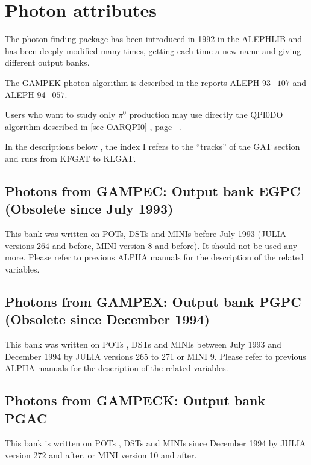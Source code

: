 \section{\label{sec-GAMPHO} Photon attributes}
\par
    The photon-finding package has been introduced in 1992 in the ALEPHLIB and has been deeply
  modified many times, getting each time a new name and giving
  different output banks.
 
\par
   The GAMPEK photon algorithm is described in the reports ALEPH 93$-107$  and ALEPH 94$-057$.
\par
       Users who want to study only $\pi^0$ production may use directly the QPI0DO algorithm described in
     \ref{sec-OARQPI0} , page ~\pageref{sec-OARQPI0}.
 
\par
  In the descriptions below , the index I refers to the ``tracks''  of the GAT section and
  runs from KFGAT to KLGAT.
 
 
\subsection{\label{sec-TVAEGPC}Photons from GAMPEC: Output bank EGPC (Obsolete since July 1993)}
\par
 This bank was written on POTs, DSTs and MINIs before July 1993 
 (JULIA versions 264 and before, MINI version 8 and before). It should not be used any more.
  Please refer to previous ALPHA manuals for the description of the related variables.
 
\subsection{\label{sec-TVAPGPC}Photons from GAMPEX: Output bank PGPC (Obsolete since December 1994)}
\par
 This bank was written on POTs , DSTs and MINIs between July 1993 and  December 1994 by
 JULIA versions 265 to 271 or MINI 9.
  Please refer to previous ALPHA manuals for the description of the related variables.
     
\subsection{\label{sec-TVAPGAC}Photons from GAMPECK: Output bank PGAC}
\par
 This bank is written on POTs , DSTs and MINIs since December 1994
 by JULIA version 272 and after, or MINI version 10 and after.
 
